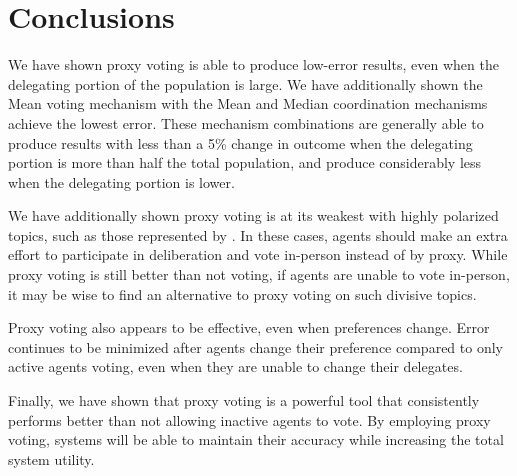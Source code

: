 \section{Conclusions}\label{sec:conclusions}
We have shown proxy voting is able to produce low-error results, even when the
delegating portion of the population is large.
We have additionally shown the Mean voting mechanism with the Mean and Median
coordination mechanisms achieve the lowest error.
These mechanism combinations are generally able to produce results with less than a 5\%
change in outcome when the delegating portion is more than half the total
population, and produce considerably less when the delegating portion is lower.

We have additionally shown proxy voting is at its weakest with highly polarized
topics, such as those represented by .
In these cases, agents should make an extra effort to participate in deliberation and
vote in-person instead of by proxy.
While proxy voting is still better than not voting, if agents are unable to vote
in-person, it may be wise to find an alternative to proxy voting on such divisive
topics.

Proxy voting also appears to be effective, even when preferences change.
Error continues to be minimized after agents change their preference compared to only
active agents voting, even when they are unable to change their delegates.

Finally, we have shown that proxy voting is a powerful tool that consistently
performs better than not allowing inactive agents to vote.
By employing proxy voting, systems will be able to maintain their accuracy while
increasing the total system utility.

